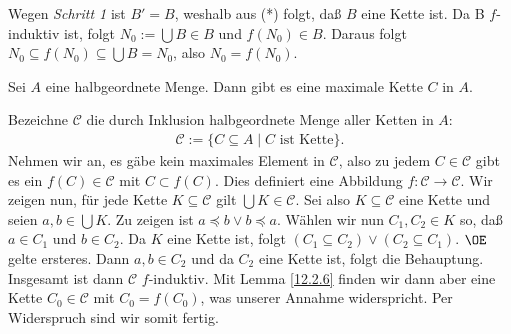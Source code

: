 \documentclass[../../main.tex]{subfiles}
\begin{document}
\begin{cproof}
\begin{behbox}
\begin{enumerate}[\normalfont(a)]
			\end{enumerate}
	\end{behbox}
	\noindent Wegen \textit{Schritt 1} ist $B'=B$, weshalb aus (*) folgt, daß $B$ eine Kette ist. Da B $f$-induktiv ist, folgt $N_0:=\bigcup B\in B$ und $f(N_0)\in B$. Daraus folgt $N_0\subseteq f(N_0)\subseteq \bigcup B=N_0$, also $N_0=f(N_0)$.
\end{cproof}

\begin{lem}\label{12.2.7}
	Sei $A$ eine halbgeordnete Menge. Dann gibt es eine maximale Kette $C$ in $A$.
\end{lem}
\begin{cproof}
	Bezeichne $\mathcal{C}$ die durch Inklusion halbgeordnete Menge aller Ketten in $A$:
	\begin{align*}
		\mathcal{C}:=\{C\subseteq A\mid C\text{ ist Kette}\}.
	\end{align*}
	Nehmen wir an, es gäbe kein maximales Element in $\mathcal{C}$, also zu jedem $C\in\mathcal{C}$ gibt es ein $f(C)\in\mathcal{C}$ mit $C\subset f(C)$. Dies definiert eine Abbildung $f: \mathcal{C}\rightarrow \mathcal{C}$. Wir zeigen nun, für jede Kette $K\subseteq\mathcal{C}$ gilt $\bigcup K\in \mathcal{C}$. Sei also $K\subseteq\mathcal{C}$ eine Kette und seien $a,b\in \bigcup K$. Zu zeigen ist $a\preceq b\lor b\preceq a$. Wählen wir nun $C_1,C_2\in K$ so, daß $a\in C_1$ und $b\in C_2$. Da $K$ eine Kette ist, folgt $(C_1\subseteq C_2)\lor (C_2\subseteq C_1)$. $\OE$ gelte ersteres. Dann $a,b\in C_2$ und da $C_2$ eine Kette ist, folgt die Behauptung.\\
				
	Insgesamt ist dann $\mathcal{C}$ $f$-induktiv. Mit Lemma \eqref{12.2.6} finden wir dann aber eine Kette $C_0\in\mathcal{C}$ mit $C_0=f(C_0)$, was unserer Annahme widerspricht. Per Widerspruch sind wir somit fertig.
\end{cproof}
\end{document}
